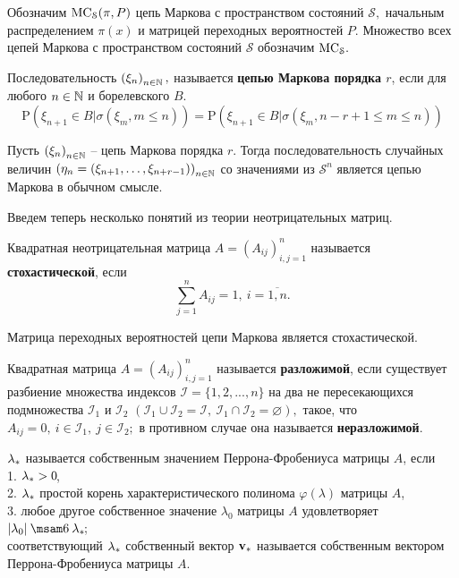 Обозначим $\mathrm{MC}_\mathcal{S}(\pi, P)$ цепь Маркова с пространством состояний $\mathcal{S}, $ начальным распределением $\pi(x)$ и матрицей переходных вероятностей $P.$ Множество всех цепей Маркова с пространством состояний $\mathcal{S}$ обозначим $\mathrm{MC}_\mathcal{S}.$

\begin{opr}
Последовательность $\left(\xi_n\right)_{n \in \N},$ называется \textbf{цепью Маркова порядка \boldmath$r$}, если для любого $n \in \N$ и борелевского $B.$ 
$$\mathrm{P} (\xi_{n + 1} \in B | \sigma(\xi_m, m \leq n)) = \mathrm{P} (\xi_{n + 1} \in B | \sigma(\xi_m, n - r + 1 \leq m \leq n))$$
\end{opr}

\begin{ass}
\label{VECTORIZE}
Пусть $\left(\xi_n\right)_{n \in \N}$ -- цепь Маркова порядка $r.$ Тогда последовательность случайных величин $\left(\eta_n = (\xi_{n+1},\ldots, \xi_{n+r-1})\right)_{n \in \N}$ со значениями из $\mathcal{S}^n$ является цепью Маркова в обычном смысле. 
\end{ass}

Введем теперь несколько понятий из теории неотрицательных матриц.

\begin{opr}
Квадратная неотрицательная матрица $A = (A_{ij})_{i,j = 1}^n$ называется \textbf{стохастической}, если
 \begin{equation}
 \label{STOCH_SUM}
 \sum_{j=1}^n A_{ij} = 1, \ i = \overline{1, n}.
 \end{equation}
\end{opr}

\begin{ass}
\label{TRANS_MATR_IS_STOCH}
Матрица переходных вероятностей цепи Маркова является стохастической.
\end{ass}

\begin{opr}
Квадратная матрица $A = (A_{ij})_{i,j = 1}^n$ называется \textbf{разложимой}, если существует разбиение множества индексов $\mathcal{I} = \{1, 2, ..., n\}$ на два не пересекающихся подмножества $ \mathcal{I}_1$ и $\mathcal{I}_2$ $(\mathcal{I}_1 \cup \mathcal{I}_2 = \mathcal{I}, \ \mathcal{I}_1 \cap \mathcal{I}_2 = \varnothing), $ такое, что $A_{ij} = 0,\  i \in \mathcal{I}_1,\ j \in \mathcal{I}_2;$ в противном случае она называется \textbf{неразложимой}.
\end{opr}

\begin{opr}
${\lambda_\ast}$ называется собственным значением Перрона-Фробениуса матрицы $A\!$, если \\
1. ${\lambda_\ast} > 0 \!$,\\
2. ${\lambda_\ast}$ простой корень характеристического полинома $\varphi(\lambda)$ матрицы $A\!$, \\
3. любое другое собственное значение $\lambda_0$ матрицы $A$ удовлетворяет $|\lambda_0| \leq \la \!$; \\
соответствующий ${\lambda_\ast}$ собственный вектор ${\mathbf{v}_\ast}$ называется собственным вектором Перрона-Фробениуса матрицы $A.$
\end{opr}

